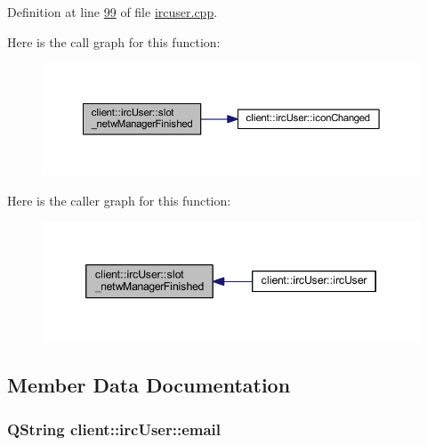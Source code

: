 Definition at line \hyperlink{custom_irc_client_2ircuser_8cpp_source_l00099}{99} of file \hyperlink{custom_irc_client_2ircuser_8cpp_source}{ircuser.\-cpp}.



Here is the call graph for this function\-:\nopagebreak
\begin{figure}[H]
\begin{center}
\leavevmode
\includegraphics[width=350pt]{d6/d69/classclient_1_1irc_user_a10dddba7236ce4577fd11eb906005d55_cgraph}
\end{center}
\end{figure}




Here is the caller graph for this function\-:
\nopagebreak
\begin{figure}[H]
\begin{center}
\leavevmode
\includegraphics[width=346pt]{d6/d69/classclient_1_1irc_user_a10dddba7236ce4577fd11eb906005d55_icgraph}
\end{center}
\end{figure}




\subsection{Member Data Documentation}
\hypertarget{classclient_1_1irc_user_a6bdc381efdca6c1ab4bd4bdc3bcb4bb9}{
\subsubsection[{email}]{\setlength{\rightskip}{0pt plus 5cm}Q\-String client\-::irc\-User\-::email\hspace{0.3cm}{\ttfamily [private]}}}\label{d6/d69/classclient_1_1irc_user_a6bdc381efdca6c1ab4bd4bdc3bcb4bb9}


